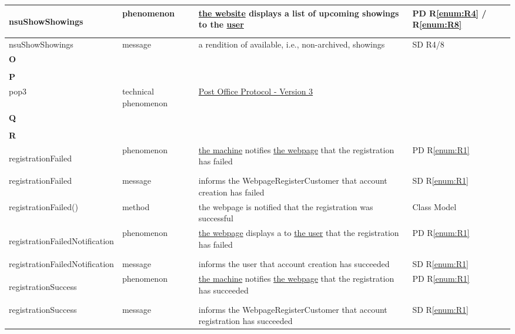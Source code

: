 \documentclass[a4paper,10pt,titlepage,bibtotoc,bibtotocnumbered]{scrreprt}
\begin{document}
\begin{longtable}{|p{4cm}|p{3cm}|p{5cm}|l|}
\hline
\hypertarget{glossary:nsuShowShowings}{nsuShowShowings} & phenomenon & \hyperlink{glossary:WebPageNonStaffUserBrowse}{the website} displays a list of upcoming showings to the \hyperlink{glossary:NonStaffUser}{user} & PD R\ref{enum:R4} / R\ref{enum:R8}\\
\hline
nsuShowShowings & message & a rendition of available, i.e., non-archived, showings & SD R4/8\\
\hline
\multicolumn{4}{|l|}{\textbf{O}}\\
\hline
&  &  & \\
\hline
\multicolumn{4}{|l|}{\textbf{P}}\\
\hline
pop3 & technical phenomenon & \hyperlink{tools.ietf.org/html/rfc1939}{Post Office Protocol - Version 3} & \\
\hline
\multicolumn{4}{|l|}{\textbf{Q}}\\
\hline
&  &  & \\
\hline
\multicolumn{4}{|l|}{\textbf{R}}\\
\hline
\hypertarget{glossary:registrationFailed}{registrationFailed} & phenomenon & \hyperlink{glossary:UDEKino}{the machine} notifies \hyperlink{glossary:WebpageRegisterCustomer}{the webpage} that the registration has failed & PD R\ref{enum:R1}\\
\hline
registrationFailed & message & informs the WebpageRegisterCustomer that account creation has failed & SD R\ref{enum:R1}\\
\hline
registrationFailed() & method & the webpage is notified that the registration was successful & Class Model\\
\hline
\hypertarget{glossary:registrationFailedNotification}{registrationFailedNotification} & phenomenon & \hyperlink{glossary:WebpageRegisterCustomer}{the webpage} displays a to \hyperlink{glossary:User}{the user} that the registration has failed & PD R\ref{enum:R1}\\
\hline
registrationFailedNotification & message & informs the user that account creation has succeeded & SD R\ref{enum:R1}\\
\hline
\hypertarget{glossary:registrationSuccess}{registrationSuccess} & phenomenon & \hyperlink{glossary:UDEKino}{the machine} notifies \hyperlink{glossary:WebpageRegisterCustomer}{the webpage} that the registration has succeeded & PD R\ref{enum:R1}\\
\hline
registrationSuccess & message & informs the WebpageRegisterCustomer that account registration has succeeded & SD R\ref{enum:R1}\\

\end{longtable}
\end{document}
